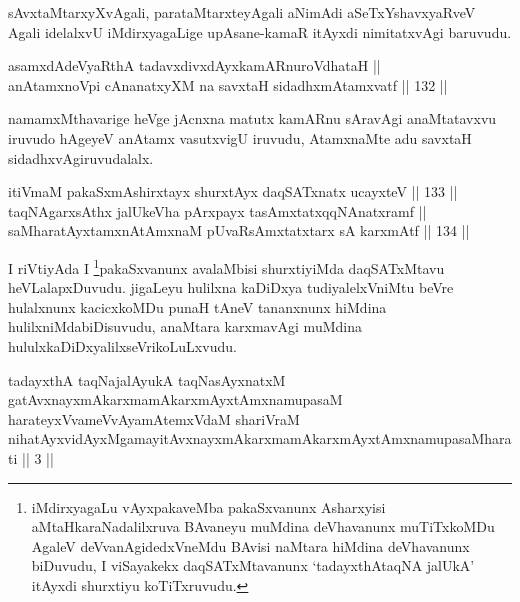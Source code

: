 \begin{artha}
sAvxtaMtarxyXvAgali, parataMtarxteyAgali aNimAdi aSeTxYshavxyaRveV
Agali idelalxvU iMdirxyagaLige upAsane-kamaR itAyxdi nimitatxvAgi baruvudu.
\end{artha}

\begin{shl}
asamxdAdeVyaRthA tadavxdivxdAyxkamARnuroVdhataH || \\
anAtamxnoV\s pi cA\s \s nanatxyXM na savxtaH sidadhxmAtamxvatf \hfill || 132 ||  
\end{shl}

\begin{artha}
namamxMthavarige heVge jAcnxna matutx kamARnu sAravAgi anaMtatavxvu
iruvudo hAgeyeV anAtamx vasutxvigU iruvudu, AtamxnaMte adu savxtaH
sidadhxvAgiruvudalalx.
\end{artha}

\begin{shl}
itiVmaM pakaSxmAshirxtayx shurxtAyx daqSATxnatx ucayxteV \hfill || 133 || \\
taqNAgarxsAthx jalUkeVha pArxpayx tasAmxtatxqqNAnatxramf || \\
saMharatAyxtamxnA\s \s tAmxnaM pUvaRsAmxtatxtarx sA karxmAtf \hfill || 134 ||  
\end{shl}

\begin{artha}
I riVtiyAda I \footnote{iMdirxyagaLu vAyxpakaveMba pakaSxvanunx Asharxyisi aMtaHkaraNadalilxruva BAvaneyu muMdina deVhavanunx muTiTxkoMDu AgaleV deVvanAgidedxVneMdu BAvisi naMtara hiMdina deVhavanunx biDuvudu, I viSayakekx daqSATxMtavanunx `tadayxthAtaqNA jalUkA' itAyxdi shurxtiyu koTiTxruvudu.}pakaSxvanunx avalaMbisi shurxtiyiMda daqSATxMtavu heVLalapxDuvudu. jigaLeyu hulilxna kaDiDxya tudiyalelxVniMtu beVre hulalxnunx kacicxkoMDu punaH tAneV tananxnunx hiMdina hulilxniMda\break biDisuvudu, anaMtara karxmavAgi muMdina hululxkaDiDxyalilx\break seVrikoLuLxvudu.
\end{artha}

\begin{kandikeshl}
tadayxthA taqNajalAyukA taqNasAyxnatxM gatAvxnayxmAkarxmamAkarxmAyxtAmxna\-\break mupasaM harateyxVvameVvAyamAtemxVdaM shariVraM nihatAyx\s vidAyxM\break gamayitAvxnayxmAkarxmamAkarxmAyxtAmxnamupasaMharati || 3 ||
\end{kandikeshl}

